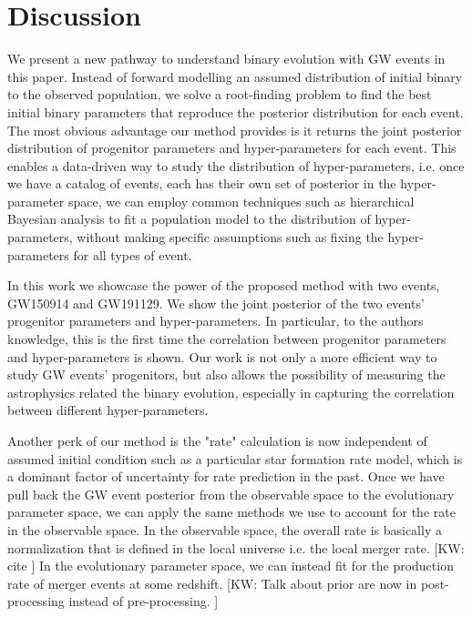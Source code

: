 \documentclass[twocolumn]{aastex631}
\newcommand{\kw}[1]{{\color{rb4}[KW: #1 ]}}
\begin{document}
\section{Discussion}
\label{sec:discussion}


We present a new pathway to understand binary evolution with GW events in this paper.
Instead of forward modelling an assumed distribution of initial binary to the observed population,
we solve a root-finding problem to find the best initial binary parameters that reproduce the posterior distribution for each event. 
The most obvious advantage our method provides is it returns the joint posterior distribution of progenitor parameters and hyper-parameters for each event.
This enables a data-driven way to study the distribution of hyper-parameters,
i.e. once we have a catalog of events, each has their own set of posterior in the hyper-parameter space,
we can employ common techniques such as hierarchical Bayesian analysis to fit a population model to the distribution of hyper-parameters,
without making specific assumptions such as fixing the hyper-parameters for all types of event.
 
In this work we showcase the power of the proposed method with two events, GW150914 and GW191129.
We show the joint posterior of the two events' progenitor parameters and hyper-parameters.
In particular, to the authors knowledge, this is the first time the correlation between progenitor parameters and hyper-parameters is shown.
Our work is not only a more efficient way to study GW events' progenitors,
but also allows the possibility of measuring the astrophysics related the binary evolution, especially in capturing the correlation between different hyper-parameters.

Another perk of our method is the "rate" calculation is now independent of assumed initial condition such as a particular star formation rate model,
which is a dominant factor of uncertainty for rate prediction in the past.
Once we have pull back the GW event posterior from the observable space to the evolutionary parameter space,
we can apply the same methods we use to account for the rate in the observable space.
In the observable space, the overall rate is basically a normalization that is defined in the local universe i.e. the local merger rate. \kw{cite}
In the evolutionary parameter space, we can instead fit for the production rate of merger events at some redshift.
\kw{Talk about prior are now in post-processing instead of pre-processing.}
\end{document}
